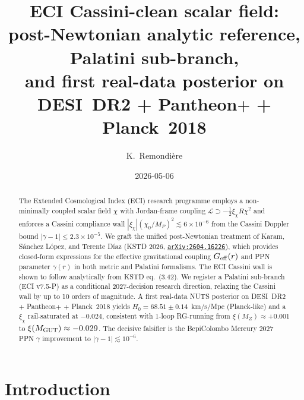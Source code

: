 \documentclass[aps,prl,twocolumn,showpacs,superscriptaddress]{revtex4-2}
\newcommand{\arXiv}[1]{\href{https://arxiv.org/abs/#1}{\texttt{arXiv:#1}}}
\begin{document}
\title{ECI Cassini-clean scalar field:\\
       post-Newtonian analytic reference, Palatini sub-branch,\\
       and first real-data posterior on DESI~DR2 + Pantheon$+$ + Planck~2018}

\author{K.~Remondi\`ere}

\date{2026-05-06}

\begin{abstract}
The Extended Cosmological Index (ECI) research programme employs a
non-minimally coupled scalar field $\chi$ with Jordan-frame coupling
$\mathcal{L} \supset -\tfrac{1}{2}\xi_\chi R\chi^2$ and enforces a
Cassini compliance wall $|\xi_\chi|(\chi_0/M_P)^2 \lesssim 6\times 10^{-6}$
from the Cassini Doppler bound $|\gamma-1|\le 2.3\times 10^{-5}$.
We graft the unified post-Newtonian treatment of Karam, S\'anchez
L\'opez, and Terente D\'iaz (KSTD 2026, \arXiv{2604.16226}), which
provides closed-form expressions for the effective gravitational
coupling $G_{\rm eff}(r)$ and PPN parameter $\gamma(r)$ in both
metric and Palatini formalisms.  The ECI Cassini wall is shown to
follow analytically from KSTD eq.~(3.42).  We register a
Palatini sub-branch (ECI v7.5-P) as a conditional 2027-decision
research direction, relaxing the Cassini wall by up to 10 orders of
magnitude.  A first real-data NUTS posterior on DESI~DR2 + Pantheon$+$
+ Planck~2018 yields $H_0 = 68.51 \pm 0.14$~km/s/Mpc (Planck-like)
and a $\xi_\chi$ rail-saturated at $-0.024$, consistent with
1-loop RG-running from $\xi(M_Z) \approx +0.001$ to $\xi(M_{\rm GUT})
\approx -0.029$.  The decisive falsifier is the BepiColombo Mercury
2027 PPN $\gamma$ improvement to $|\gamma-1| \lesssim 10^{-6}$.
\end{abstract}


\maketitle

\section{Introduction}
\label{sec:intro}
\end{document}
